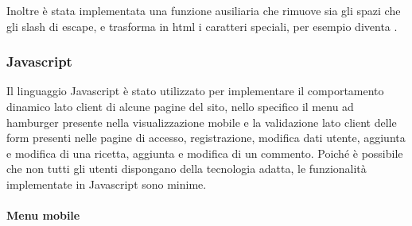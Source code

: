 Inoltre è stata implementata una funzione ausiliaria  che rimuove sia gli spazi che gli slash di escape, e trasforma in html i caratteri speciali, per esempio  diventa .

\subsubsection{Javascript}\label{subs:javascript}
Il linguaggio Javascript è stato utilizzato per implementare il comportamento dinamico lato client di alcune pagine del sito, nello specifico il menu ad hamburger presente nella visualizzazione mobile e la validazione lato client delle form presenti nelle pagine di accesso, registrazione, modifica dati utente, aggiunta e modifica di una ricetta, aggiunta e modifica di un commento.
Poiché è possibile che non tutti gli utenti dispongano della tecnologia adatta, le funzionalità implementate in Javascript sono minime. 
\paragraph{Menu mobile}\label{par:menu_mobile}
